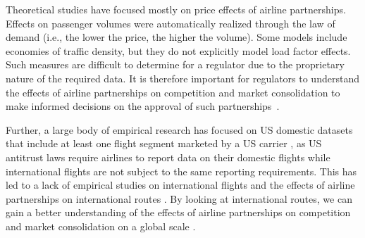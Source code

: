 \documentclass[preprint,times]{elsarticle}
\begin{document}
Theoretical studies have focused mostly on price effects of airline partnerships. Effects on passenger volumes were automatically realized through the law of demand (i.e., the lower the price, the higher the volume). Some models include economies of traffic density, but they do not explicitly model load factor effects. Such measures are difficult to determine for a regulator due to the proprietary nature of the required data. It is therefore important for regulators to understand the effects of airline partnerships on competition and market consolidation to make informed decisions on the approval of such partnerships~\citep{Brue01}.

Further, a large body of empirical research has focused on US domestic datasets that include at least one flight segment marketed by a US carrier \citep{Bilotkach2019}, as US antitrust laws require airlines to report data on their domestic flights while international flights are not subject to the same reporting requirements. This has led to a lack of empirical studies on international flights and the effects of airline partnerships on international routes \citep{Bilotkach2019a,Brueckner2000}. By looking at international routes, we can gain a better understanding of the effects of airline partnerships on competition and market consolidation on a global scale \citep{OumParkZhan96, Bilotkach2019}.
\end{document}
